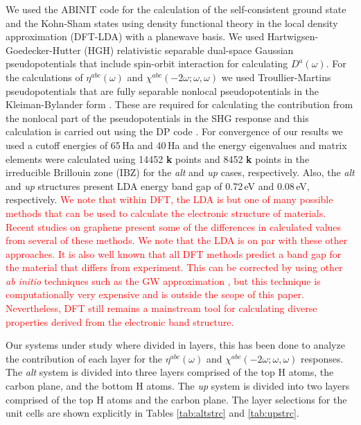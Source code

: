\documentclass[pss]{wiley2sp} %
\begin{document}
We used the ABINIT code \cite{gonzeCPC09} for the calculation of the 
self-consistent ground state and the Kohn-Sham states using density functional
theory in the local density approximation (DFT-LDA) with a planewave basis. We
used Hartwigsen-Goedecker-Hutter (HGH) relativistic separable dual-space
Gaussian pseudopotentials \cite{hartwigsenPRB98} that include spin-orbit
interaction for calculating $D^{a}(\omega)$. For the calculations of
{$\eta^{abc}(\omega)$} and $\chi^{abc}(-2\omega;\omega,\omega)$ we used
Troullier-Martins pseudopotentials \cite{troullierPRB91} that are fully
separable nonlocal pseudopotentials in the Kleiman-Bylander form
\cite{kleinmanPRL82}. These are required for calculating the contribution from
the nonlocal part of the pseudopotentials in the SHG response and this
calculation is carried out using the DP code \cite{olevanoDP}. For convergence
of our results we used a cutoff energies of 65\,Ha and 40\,Ha and the energy
eigenvalues and matrix elements were calculated using 14452 \textbf{k} points
and 8452 \textbf{k} points in the irreducible Brillouin zone (IBZ) for the
\emph{alt} and \emph{up} cases, respectively. Also, the \emph{alt} and
\emph{up} structures present LDA energy band gap of  0.72\,eV and 0.08\,eV,
respectively.
\textcolor{red}{
We note that within DFT, the LDA is but one of many possible methods that can
be used to calculate the electronic structure of materials. Recent studies on
graphene \cite{karamanisJPCC15,botelloACR14} present some of the differences
in calculated values from several of these methods. We note that the LDA is on
par with these other approaches. It is also well known that all DFT methods
predict a band gap for the material that differs from experiment. This can be
corrected by using other \emph{ab initio} techniques such as the GW
approximation \cite{onidaRMP02}, but this technique is computationally very
expensive and is outside the scope of this paper. Nevertheless, DFT still
remains a mainstream tool for calculating diverse properties derived from the
electronic band structure. }

Our systems under study where divided in layers, this has been done to analyze
the contribution of each layer for the $\eta^{abc}(\omega)$ and
$\chi^{abc}(-2\omega;\omega,\omega)$ responses. The
\emph{alt} system is divided into three layers comprised of the top H atoms,
the carbon plane, and the bottom H atoms. The \emph{up} system is divided into
two layers comprised of the top H atoms and the carbon plane. The layer
selections for the unit cells are shown explicitly in Tables \ref{tab:altstrc}
and \ref{tab:upstrc}.
\end{document}
